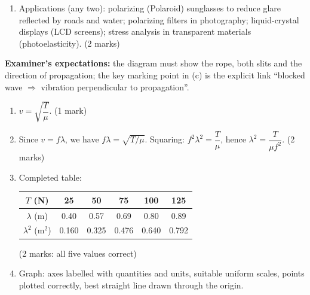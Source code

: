 \documentclass[11pt]{article}
\begin{document}
\begin{corrige}
\begin{enumerate}
\item Applications (any two): polarizing (Polaroid) sunglasses to reduce glare reflected by roads and water; polarizing filters in photography; liquid-crystal displays (LCD screens); stress analysis in transparent materials (photoelasticity). \hfill (2 marks)
\end{enumerate}
\textbf{Examiner's expectations:} the diagram must show the rope, both slits and the direction of propagation; the key marking point in (c) is the explicit link ``blocked wave $\Rightarrow$ vibration perpendicular to propagation''.
\end{corrige}

\begin{corrige}
\begin{enumerate}
\item $v=\sqrt{\dfrac{T}{\mu}}$. \hfill (1 mark)
\item Since $v=f\lambda$, we have $f\lambda=\sqrt{T/\mu}$. Squaring: $f^2\lambda^2=\dfrac{T}{\mu}$, hence $\lambda^2=\dfrac{T}{\mu f^2}$. \hfill (2 marks)
\item Completed table:
\begin{center}
\begin{tabular}{|c|c|c|c|c|c|}
\hline
\rowcolor{popblueL} $T$ (N) & 25 & 50 & 75 & 100 & 125 \\
\hline
$\lambda$ (m) & 0.40 & 0.57 & 0.69 & 0.80 & 0.89 \\
\hline
$\lambda^2$ ($\mathrm{m^2}$) & 0.160 & 0.325 & 0.476 & 0.640 & 0.792 \\
\hline
\end{tabular}
\end{center}
\hfill (2 marks: all five values correct)
\item Graph: axes labelled with quantities and units, suitable uniform scales, points plotted correctly, best straight line drawn through the origin.
\begin{center}

\end{center}
\end{enumerate}
\end{corrige}
\end{document}
